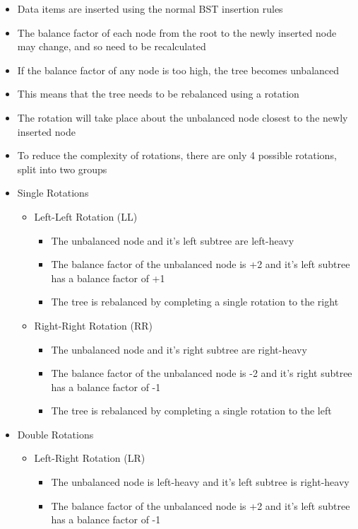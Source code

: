 \begin{itemize}
  \item Data items are inserted using the normal BST insertion rules
  \item The balance factor of each node from the root to the newly inserted node may change, and so need to be recalculated
  \item If the balance factor of any node is too high, the tree becomes unbalanced
  \item This means that the tree needs to be rebalanced using a rotation
  \item The rotation will take place about the unbalanced node closest to the newly inserted node
  \item To reduce the complexity of rotations, there are only 4 possible rotations, split into two groups
  \item Single Rotations
  \begin{itemize}
    \item Left-Left Rotation (LL)
    \begin{itemize}
      \item The unbalanced node and it's left subtree are left-heavy
      \item The balance factor of the unbalanced node is +2 and it's left subtree has a balance factor of +1
      \item The tree is rebalanced by completing a single rotation to the right
    \end{itemize}
    \item Right-Right Rotation (RR)
    \begin{itemize}
      \item The unbalanced node and it's right subtree are right-heavy
      \item The balance factor of the unbalanced node is -2 and it's right subtree has a balance factor of -1
      \item The tree is rebalanced by completing a single rotation to the left
    \end{itemize}
  \end{itemize}
  \item Double Rotations
  \begin{itemize}
    \item Left-Right Rotation (LR)
    \begin{itemize}
      \item The unbalanced node is left-heavy and it's left subtree is right-heavy
      \item The balance factor of the unbalanced node is +2 and it's left subtree has a balance factor of -1

\end{itemize}
\end{itemize}
\end{itemize}
